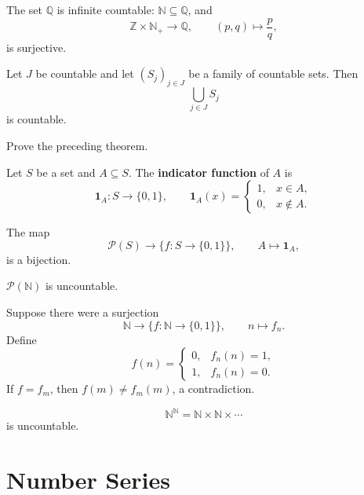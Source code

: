 \begin{exampleenv}
The set $\mathbb Q$ is infinite countable: $\mathbb N\subseteq\mathbb Q$, and
\[
    \mathbb Z\times\mathbb N_+\to\mathbb Q,
    \qquad
    (p,q)\mapsto \frac pq,
\]
is surjective.
\end{exampleenv}

\begin{theoremenv}
Let $J$ be countable and let $(S_j)_{j\in J}$ be a family of countable sets.
Then
\[
    \bigcup_{j\in J}S_j
\]
is countable.
\end{theoremenv}

\begin{exerciseenv}
Prove the preceding theorem.
\end{exerciseenv}

\begin{definitionenv}
Let $S$ be a set and $A\subseteq S$. The \textbf{indicator function} of $A$ is
\[
    \mathbf 1_A:S\to\{0,1\},
    \qquad
    \mathbf 1_A(x)=
    \begin{cases}
        1,&x\in A,\\
        0,&x\notin A.
    \end{cases}
\]
\end{definitionenv}

\begin{propositionenv}
The map
\[
    \mathcal P(S)\longrightarrow\{f:S\to\{0,1\}\},
    \qquad
    A\longmapsto\mathbf 1_A,
\]
is a bijection.
\end{propositionenv}

\begin{theoremenv}[Cantor]
$\mathcal P(\mathbb N)$ is uncountable.
\end{theoremenv}

\begin{proofenv}
Suppose there were a surjection
\[
    \mathbb N\to\{f:\mathbb N\to\{0,1\}\},
    \qquad n\mapsto f_n.
\]
Define
\[
    f(n)=
    \begin{cases}
        0,&f_n(n)=1,\\
        1,&f_n(n)=0.
    \end{cases}
\]
If $f=f_m$, then $f(m)\neq f_m(m)$, a contradiction.
\end{proofenv}

\begin{propositionenv}
\[
    \mathbb N^{\mathbb N}
    =
    \mathbb N\times\mathbb N\times\cdots
\]
is uncountable.
\end{propositionenv}


\section{Number Series}

